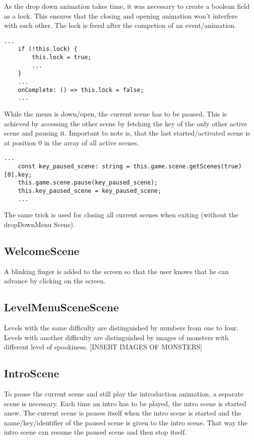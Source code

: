 As the drop down animation takes time, it was necessary to create a boolean field as a lock.
This ensures that the closing and opening animation won't interfere with each other.
The lock is freed after the competion of an event/animation.

\begin{lstlisting}[style=TypeScript, caption=Lock aquiring and freeing]
    ...
    if (!this.lock) {
        this.lock = true;
        ...
    }
    ...
    onComplete: () => this.lock = false;
    ...
\end{lstlisting}

While the menu is down/open, the current scene has to be paused.
This is achieved by accessing the other scene by fetching the key of the only other active scene and pausing it.
Important to note is, that the last started/activated scene is at position 0 in the array of all active scenes.
\begin{lstlisting}[style=TypeScript, caption=Fetching current active scene]
    ...
    const key_paused_scene: string = this.game.scene.getScenes(true)[0].key;
    this.game.scene.pause(key_paused_scene);
    this.key_paused_scene = key_paused_scene;
    ...
\end{lstlisting}

The same trick is used for closing all current scenes when exiting (without the dropDownMenu Scene).

\subsection{WelcomeScene}\label{subsec:welcomescene}
A blinking finger is added to the screen so that the user knows that he can advance by clicking on the screen.

\subsection{LevelMenuSceneScene}\label{subsec:levelmenuscenescene}
Levels with the same difficulty are distinguished by numbers from one to four.
Levels with another difficulty are distinguished by images of monsters with different level of spookiness.
[INSERT IMAGES OF MONSTERS]

\subsection{IntroScene}\label{subsec:introscene}
To pause the current scene and still play the introduction animation, a separate scene is necessary.
Each time an intro has to be played, the intro scene is started anew.
The current scene is pauses itself when the intro scene is started and the name/key/identifier
of the paused scene is given to the intro scene.
That way the intro scene can resume the paused scene and then stop itself.

